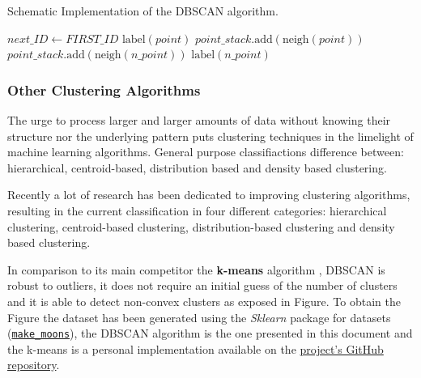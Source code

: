 \documentclass[10pt,journal,compsoc]{IEEEtran}
\let\MYoriglatexcaption\caption
\renewcommand{\caption}[2][\relax]{\MYoriglatexcaption[#2]{#2}}
\begin{document}
\begin{algorithm}
  \caption{Schematic Implementation of the DBSCAN algorithm. \label{alg:original-main}}
  \begin{algorithmic}[1]
        \State $next\_ID \gets FIRST\_ID$
                \State $\text{label}(point)$
                \State $point\_stack.\text{add}(\text{neigh}(point))$
                        \State $point\_stack.\text{add}(\text{neigh}(n\_point))$
                    \EndIf
                    \State $\text{label}(n\_point)$
                \EndFor
            \EndIf
        \EndFor
    \EndFunction
  \end{algorithmic}
\end{algorithm}

\subsubsection{Other Clustering Algorithms} \label{sec:other-clust-alg}

The urge to process larger and larger amounts of data without knowing their structure nor the underlying pattern puts clustering techniques in the limelight of machine learning algorithms. General purpose classifiactions difference between: hierarchical, centroid-based, distribution based and density based clustering.

Recently a lot of research has been dedicated to improving clustering algorithms, resulting in the current classification in four different categories: hierarchical clustering, centroid-based clustering, distribution-based clustering and density based clustering.

In comparison to its main competitor the \textbf{k-means} algorithm \cite{kmeans}, DBSCAN is robust to outliers, it does not require an initial guess of the number of clusters and it is able to detect non-convex clusters as exposed in Figure. To obtain the Figure the dataset has been generated using the \textit{Sklearn} package for datasets (\href{http://scikit-learn.org/stable/modules/generated/sklearn.datasets.make_moons.html}{\texttt{make\_moons}}), the DBSCAN algorithm is the one presented in this document and the k-means is a personal implementation available on the \href{https://github.com/csegarragonz/DBSCAN-pyCOMPSs}{project's GitHub repository}.
\end{document}
